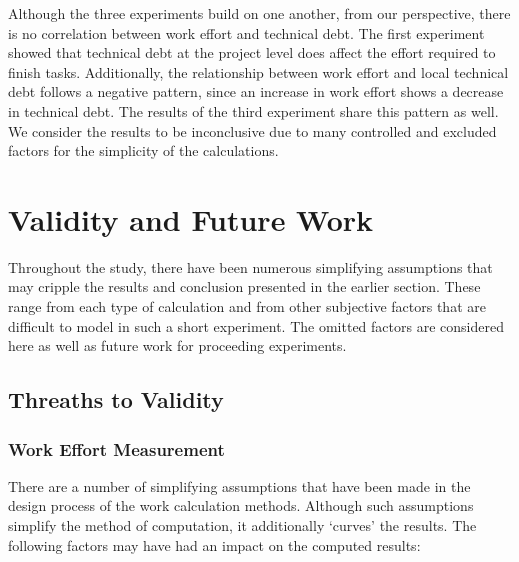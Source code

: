 \documentclass{mpaper}
\begin{document}
Although the three experiments build on one another, from our perspective, there
is no correlation between work effort and technical debt. The first experiment
showed that technical debt at the project level does affect the effort required
to finish tasks. Additionally, the relationship between work effort and local
technical debt follows a negative pattern, since an increase in work effort
shows a decrease in technical debt. The results of the third experiment share
this pattern as well. We consider the results to be inconclusive due to many
controlled and excluded factors for the simplicity of the calculations.

\section{Validity and Future Work}
\label{validity-future-work}

Throughout the study, there have been numerous simplifying assumptions that may
cripple the results and conclusion presented in the earlier section. These range
from each type of calculation and from other subjective factors that are
difficult to model in such a short experiment. The omitted factors are
considered here as well as future work for proceeding experiments.

\subsection{Threaths to Validity}
\label{validity}

\subsubsection*{Work Effort Measurement}
\label{validity-work}

There are a number of simplifying assumptions that have been made in the design
process of the work calculation methods. Although such assumptions simplify the
method of computation, it additionally `curves' the results. The following
factors may have had an impact on the computed results:
\end{document}
